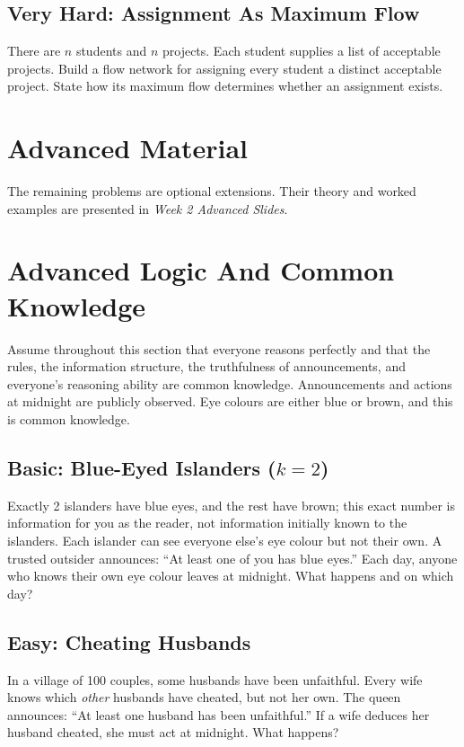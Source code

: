 \documentclass[12pt]{article}
\begin{document}
\subsection*{Very Hard: Assignment As Maximum Flow}
There are $n$ students and $n$ projects. Each student supplies a list
of acceptable projects. Build a flow network for assigning every
student a distinct acceptable project. State how its maximum flow
determines whether an assignment exists.

\newpage
\section*{Advanced Material}
The remaining problems are optional extensions. Their theory and
worked examples are presented in \textit{Week 2 Advanced Slides}.

\section{Advanced Logic And Common Knowledge}

Assume throughout this section that everyone reasons perfectly and
that the rules, the information structure, the truthfulness of
announcements, and everyone's reasoning ability are common knowledge.
Announcements and actions at midnight are publicly observed. Eye
colours are either blue or brown, and this is common knowledge.

\subsection*{Basic: Blue-Eyed Islanders ($k=2$)}
Exactly 2 islanders have blue eyes, and the rest have brown; this exact
number is information for you as the reader, not information initially
known to the islanders. Each islander can see everyone else's eye
colour but not their own. A trusted outsider announces: ``At least
one of you has blue eyes.'' Each day, anyone who knows their own eye
colour leaves at midnight. What happens and on which day?

\subsection*{Easy: Cheating Husbands}
In a village of 100 couples, some husbands have been unfaithful.
Every wife knows which \emph{other} husbands have cheated, but not
her own. The queen announces: ``At least one husband has been
unfaithful.'' If a wife deduces her husband cheated, she must act at
midnight. What happens?
\end{document}
